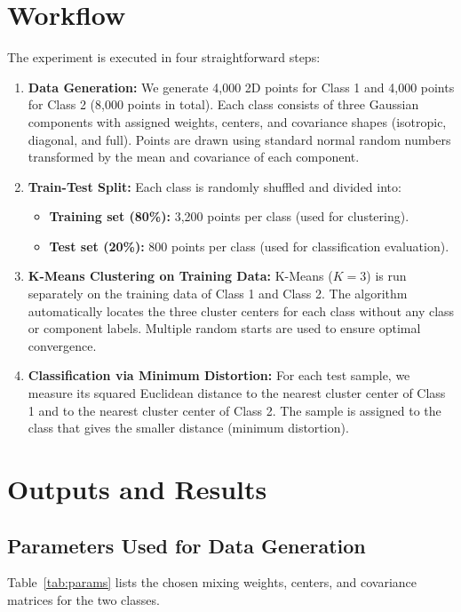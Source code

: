 \documentclass[11pt,a4paper]{article}
\begin{document}
\section{Workflow}
The experiment is executed in four straightforward steps:
\begin{enumerate}
  \item \textbf{Data Generation:}
  We generate 4,000 2D points for Class 1 and 4,000 points for Class 2 (8,000 points in total). Each class consists of three Gaussian components with assigned weights, centers, and covariance shapes (isotropic, diagonal, and full). Points are drawn using standard normal random numbers transformed by the mean and covariance of each component.
  
  \item \textbf{Train-Test Split:}
  Each class is randomly shuffled and divided into:
  \begin{itemize}
    \item \textbf{Training set (80\%):} 3,200 points per class (used for clustering).
    \item \textbf{Test set (20\%):} 800 points per class (used for classification evaluation).
  \end{itemize}

  \item \textbf{K-Means Clustering on Training Data:}
  K-Means ($K=3$) is run separately on the training data of Class 1 and Class 2. The algorithm automatically locates the three cluster centers for each class without any class or component labels. Multiple random starts are used to ensure optimal convergence.

  \item \textbf{Classification via Minimum Distortion:}
  For each test sample, we measure its squared Euclidean distance to the nearest cluster center of Class 1 and to the nearest cluster center of Class 2. The sample is assigned to the class that gives the smaller distance (minimum distortion).
\end{enumerate}

\section{Outputs and Results}

\subsection{Parameters Used for Data Generation}
Table~\ref{tab:params} lists the chosen mixing weights, centers, and covariance matrices for the two classes.
\end{document}
